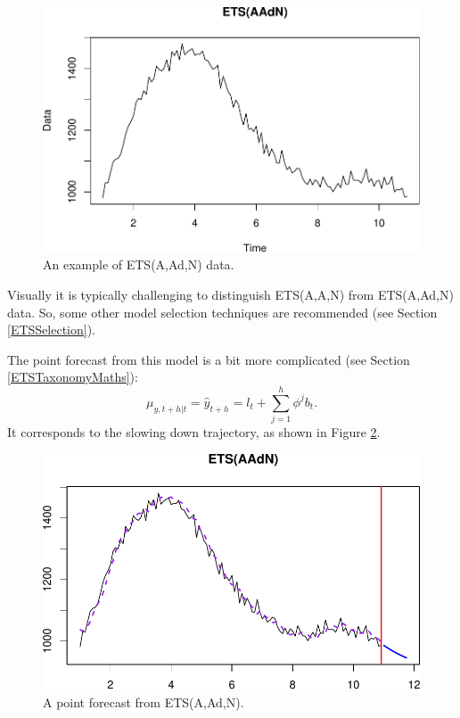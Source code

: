 \documentclass[]{book}
\theoremstyle{definition}
\theoremstyle{definition}
\theoremstyle{definition}
\theoremstyle{definition}
\theoremstyle{remark}
\begin{document}
\begin{figure}
\centering
\includegraphics{Svetunkov--2022----ADAM_files/figure-latex/ETSAAdNExample-1.pdf}
\caption{\label{fig:ETSAAdNExample}An example of ETS(A,Ad,N) data.}
\end{figure}

Visually it is typically challenging to distinguish ETS(A,A,N) from ETS(A,Ad,N) data. So, some other model selection techniques are recommended (see Section \ref{ETSSelection}).

The point forecast from this model is a bit more complicated (see Section \ref{ETSTaxonomyMaths}):
\begin{equation}
    \mu_{y,t+h|t} = \hat{y}_{t+h} = l_{t} + \sum_{j=1}^h \phi^j b_t.
  \label{eq:ETSAAdNForecast}
\end{equation}
It corresponds to the slowing down trajectory, as shown in Figure \ref{fig:ETSAAdNExampleForecast}.

\begin{figure}
\centering
\includegraphics{Svetunkov--2022----ADAM_files/figure-latex/ETSAAdNExampleForecast-1.pdf}
\caption{\label{fig:ETSAAdNExampleForecast}A point forecast from ETS(A,Ad,N).}
\end{figure}
\end{document}
